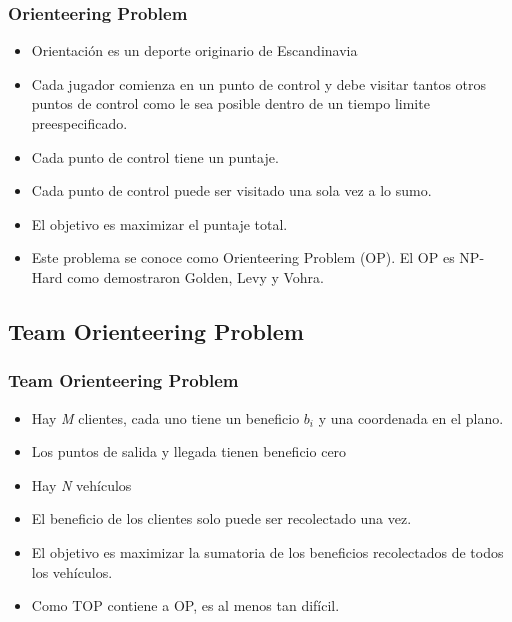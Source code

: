 \documentclass{beamer}
\begin{document}
\begin{frame}
\frametitle{Orienteering Problem}

\begin{itemize}
    \item Orientaci\'on es un deporte originario de Escandinavia
    \pause
    \item Cada jugador comienza en un punto de control y debe visitar tantos otros puntos de control como le sea posible dentro de un tiempo limite preespecificado. 
    \pause
    \item Cada punto de control tiene un puntaje.
    \pause
    \item Cada punto de control puede ser visitado una sola vez a lo sumo.
    \pause
    \item El objetivo es maximizar el puntaje total.
    \pause
    \item Este problema se conoce como Orienteering Problem (OP). El OP es NP-Hard como demostraron Golden, Levy y Vohra.
\end{itemize}

\end{frame}


\subsection{Team Orienteering Problem}
\begin{frame}
\frametitle{Team Orienteering Problem}

\begin{itemize}
    \item Hay \textit{M} clientes, cada uno tiene un beneficio $b_i$ y una coordenada en el plano.
    \pause
    \item Los puntos de salida y llegada tienen beneficio cero
    \pause    
    \item Hay \textit{N} veh\'iculos
    \pause
    \item El beneficio de los clientes solo puede ser recolectado una vez.
    \pause
    \item El objetivo es maximizar la sumatoria de los beneficios recolectados de todos los vehículos.
    \pause
    \item Como TOP contiene a OP, es al menos tan dif\'icil.
\end{itemize}

\end{frame}
\end{document}

